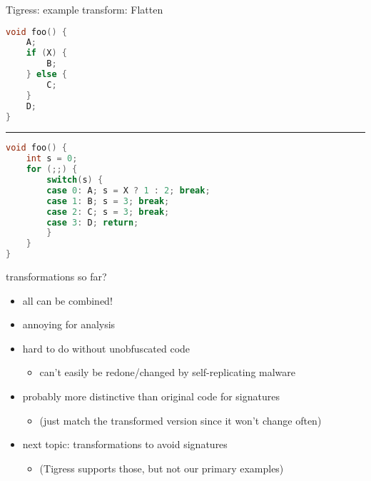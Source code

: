 \begin{frame}[fragile,label=TigressFlatten]{Tigress: example transform: Flatten}
\begin{lstlisting}[language=C++,style=smaller]
void foo() {
    A;
    if (X) {
        B;
    } else {
        C;
    }
    D;
}
\end{lstlisting}
\hrule
\begin{lstlisting}[language=C++,style=smaller]
void foo() {
    int s = 0;
    for (;;) {
        switch(s) {
        case 0: A; s = X ? 1 : 2; break;
        case 1: B; s = 3; break;
        case 2: C; s = 3; break;
        case 3: D; return;
        }
    }
}
\end{lstlisting}
\end{frame}

\begin{frame}{transformations so far?}
    \begin{itemize}
    \item all can be combined!
    \item annoying for analysis
    \item hard to do without unobfuscated code
        \begin{itemize}
        \item can't easily be redone/changed by self-replicating malware
        \end{itemize}
    \item probably more distinctive than original code for signatures
        \begin{itemize}
        \item (just match the transformed version since it won't change often)
        \end{itemize}
    \vspace{.5cm}
    \item next topic: transformations to avoid signatures
        \begin{itemize}
        \item (Tigress supports those, but not our primary examples)
        \end{itemize}
    \end{itemize}
\end{frame}
